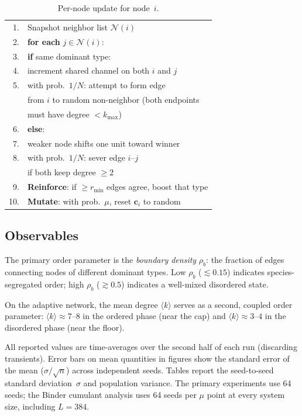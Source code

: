 \documentclass[preprint,12pt]{elsarticle}
\newcommand{\rb}{\rho_b}              %
\newcommand{\kavg}{\langle k \rangle} %
\newcommand{\Lsys}{L}                 %
\newcommand{\rmin}{r_{\min}}           %
\newcommand{\kmax}{k_{\max}}           %
\begin{document}
\begin{table}[h]
\centering
\caption{Per-node update for node~$i$.}
\label{alg:update}
\begin{tabular}{@{}r@{\;}l@{}}
\toprule
1. & Snapshot neighbor list $\mathcal{N}(i)$ \\
2. & \textbf{for each} $j \in \mathcal{N}(i)$: \\
3. & \quad \textbf{if} same dominant type: \\
4. & \qquad increment shared channel on both $i$ and $j$ \\
5. & \qquad [adaptive] with prob.\ $1/N$: attempt to form edge \\
   & \qquad from $i$ to random non-neighbor (both endpoints \\
   & \qquad must have degree $< \kmax$) \\
6. & \quad \textbf{else}: \\
7. & \qquad weaker node shifts one unit toward winner \\
8. & \qquad [adaptive] with prob.\ $1/N$: sever edge $i$--$j$ \\
   & \qquad if both keep degree $\ge 2$ \\
9. & \textbf{Reinforce}: if $\ge \rmin$ edges agree, boost that type \\
10.& \textbf{Mutate}: with prob.\ $\mu$, reset $\bm{c}_i$ to random \\
\bottomrule
\end{tabular}
\end{table}

\subsection{Observables}

The primary order parameter is the \emph{boundary density}
$\rb$: the fraction of edges connecting nodes of different
dominant types.
Low $\rb$ ($\lesssim 0.15$) indicates species-segregated order;
high $\rb$ ($\gtrsim 0.5$) indicates a well-mixed disordered state.

On the adaptive network, the mean degree $\kavg$ serves as a
second, coupled order parameter: $\kavg \approx 7$--$8$ in the
ordered phase (near the cap) and $\kavg \approx 3$--$4$ in the
disordered phase (near the floor).

All reported values are time-averages over the second half of
each run (discarding transients).
Error bars on mean quantities in figures show the standard
error of the mean ($\sigma / \sqrt{n}$) across independent
seeds.
Tables report the seed-to-seed standard deviation~$\sigma$
and population variance.
The primary experiments use 64 seeds; the Binder cumulant
analysis uses 64 seeds per $\mu$ point at every system
size, including $\Lsys = 384$.
\end{document}
